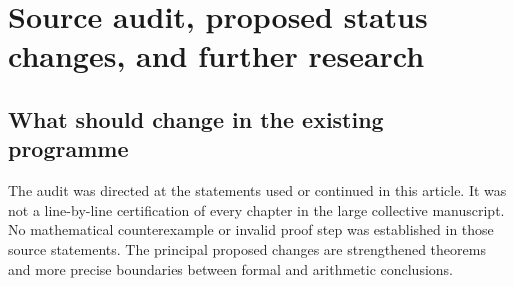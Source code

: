 \section{Source audit, proposed status changes, and further research}
\label{sec:audit-research}

\subsection{What should change in the existing programme}

The audit was directed at the statements used or continued in this
article. It was not a line-by-line certification of every chapter in the
large collective manuscript. No mathematical counterexample or invalid
proof step was established in those source statements. The principal
proposed changes are strengthened theorems and more precise boundaries
between formal and arithmetic conclusions.

